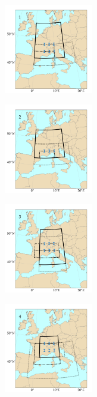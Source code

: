\documentclass[twocol]{ametsoc}
\begin{document}
\begin{figure}[htb]
	\centering
	\begin{subfigure}{.5\columnwidth}
		\centering
		\includegraphics[width=3.9cm]{figures/spatial_win_z4-hi2/Spatial_windows_1.png}
	\end{subfigure}%
	\begin{subfigure}{.5\columnwidth}
		\centering
		\includegraphics[width=3.9cm]{figures/spatial_win_z4-hi2/Spatial_windows_2.png}
	\end{subfigure}
	\begin{subfigure}{.5\columnwidth}
		\centering
		\includegraphics[width=3.9cm]{figures/spatial_win_z4-hi2/Spatial_windows_3.png}
	\end{subfigure}%
	\begin{subfigure}{.5\columnwidth}
		\centering
		\includegraphics[width=3.9cm]{figures/spatial_win_z4-hi2/Spatial_windows_4.png}
	\end{subfigure}

\end{figure}
\end{document}
